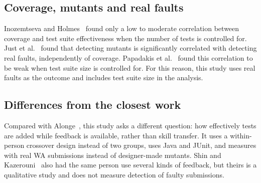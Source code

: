 \subsection{Coverage, mutants and real faults}
Inozemtseva and Holmes~\cite{inozemtseva2014} found only a low to moderate correlation between coverage and test suite effectiveness when the number of tests is controlled for. Just et al.~\cite{just2014} found that detecting mutants is significantly correlated with detecting real faults, independently of coverage. Papadakis et al.~\cite{papadakis2018} found this correlation to be weak when test suite size is controlled for. For this reason, this study uses real faults as the outcome and includes test suite size in the analysis.

\subsection{Differences from the closest work}
Compared with Alonge~\cite{alonge2025}, this study asks a different question: how effectively tests are added while feedback is available, rather than skill transfer. It uses a within-person crossover design instead of two groups, uses Java and JUnit, and measures with real WA submissions instead of designer-made mutants. Shin and Kazerouni~\cite{shin2024} also had the same person use several kinds of feedback, but theirs is a qualitative study and does not measure detection of faulty submissions.
